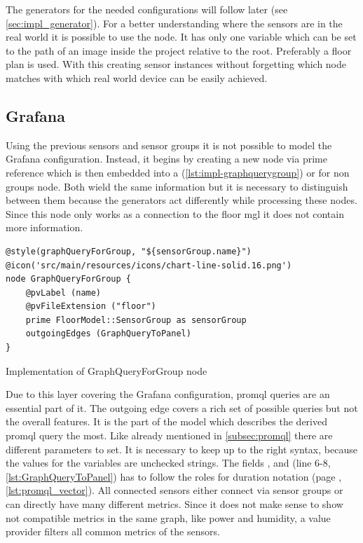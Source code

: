 The generators for the needed configurations will follow later (see \cref{sec:impl_generator}). For a better understanding where the sensors are in the real world it is possible to use the  node. It has only one variable which can be set to the path of an image inside the project relative to the root. Preferably a floor plan is used. With this creating sensor instances without forgetting which node matches with which real world device can be easily achieved.

\subsection{Grafana}

Using the previous sensors and sensor groups it is not possible to model the Grafana configuration. Instead, it begins by creating a new node via prime reference which is then embedded into a  (\cref{lst:impl-graphquerygroup}) or for non groups  node. Both wield the same information but it is necessary to distinguish between them because the generators act differently while processing these nodes. Since this node only works as a connection to the floor \gls{mgl} it does not contain more information. 

\begin{listing}[H]
	\begin{verbatim}
@style(graphQueryForGroup, "${sensorGroup.name}")
@icon('src/main/resources/icons/chart-line-solid.16.png')
node GraphQueryForGroup {
	@pvLabel (name)
	@pvFileExtension ("floor")
	prime FloorModel::SensorGroup as sensorGroup
	outgoingEdges (GraphQueryToPanel)
}
	\end{verbatim}
	\caption{Implementation of GraphQueryForGroup node}
	\label{lst:impl-graphquerygroup}
\end{listing}

Due to this layer covering the Grafana configuration, \gls{promql} queries are an essential part of it. The outgoing edge  covers a rich set of possible queries but not the overall features. It is the part of the model which describes the derived \gls{promql} query the most. Like already mentioned in \cref{subsec:promql} there are different parameters to set. It is necessary to keep up to the right syntax, because the values for the variables are unchecked strings. The fields ,  and  (line 6-8, \cref{lst:GraphQueryToPanel}) has to follow the roles for duration notation (page \pageref{lst:promql_vector}, \cref{lst:promql_vector}). All connected sensors either connect via sensor groups or can directly have many different metrics. Since it does not make sense to show not compatible metrics in the same graph, like power and humidity, a value provider filters all common metrics of the sensors. 

